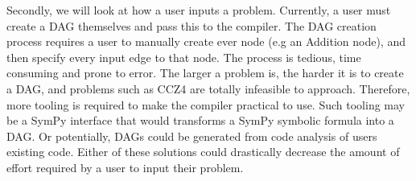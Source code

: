 Secondly, we will look at how a user inputs a problem.
Currently, a user must create a DAG themselves and pass this to the compiler.
The DAG creation process requires a user to manually create ever node (e.g an Addition node), and then specify every input edge to that node.
The process is tedious, time consuming and prone to error.
The larger a problem is, the harder it is to create a DAG, and problems such as CCZ4 are totally infeasible to approach.
Therefore, more tooling is required to make the compiler practical to use.
Such tooling may be a SymPy interface that would transforms a SymPy symbolic formula into a DAG.
Or potentially, DAGs could be generated from code analysis of users existing code.
Either of these solutions could drastically decrease the amount of effort required by a user to input their problem.  
